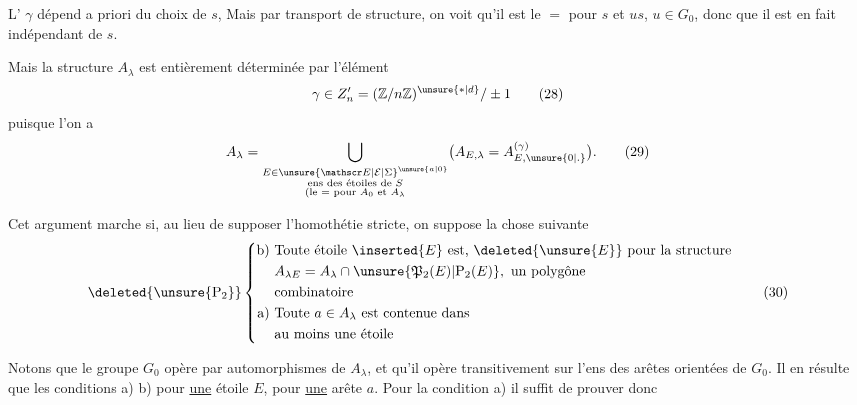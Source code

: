 L' $\gamma$ dépend a priori du choix de $s$, Mais  par transport de structure, on voit qu'il est le $=$ pour $s$ et  $us$, $u\in G_0$, donc que il est en fait indépendant de $s$.

Mais   la structure $A_\lambda$ est entièrement déterminée par  l'élément
\[
\gamma\in Z'_n=(\mathbb Z/n\mathbb Z)^{\unsure{*|d}}/\pm1\tag*{(28)}
\]
puisque l'on a
\[
A_\lambda=\bigcup_{\substack{E\in{\unsure{\mathscr E|\mathcal E|\Sigma}}^{\unsure{a|0}}\\\text{ens des étoiles de } S\\(\text{le }=\text{ pour }A_0\text{ et }A_\lambda}}
\bigl(A_{E,\lambda}=A_{E,\unsure{0|.}}^{(\gamma)}\bigr).\tag*{(29)}
\]

Cet argument marche si, au lieu de supposer l'homothétie stricte, on suppose la chose suivante
\[
\deleted{\unsure{\mathrm P_2}}\left\{\begin{aligned}
\text{b)}\ &\text{Toute étoile }\inserted{E}\text{ est, }\deleted{\unsure{E}}\text{ pour la structure}\\
&A_{\lambda E}=A_\lambda\cap\unsure{\mathfrak P_2(E)|\mathrm P_2(E)},\ \text{un polygône}\\
&\text{combinatoire}\\
\text{a)}\ &\text{Toute }a\in A_\lambda\text{ est contenue dans}\\
&\text{au moins une étoile}
\end{aligned}\right.\tag*{(30)}
\]
\noindent{}

Notons que le groupe $G_0$ opère par automorphismes de $A_\lambda$, et qu'il opère transitivement sur l'ens des arêtes orientées de $G_0$. Il en résulte que  les conditions a) b) pour \uline{une} étoile $E$, pour \uline{une} arête $a$.  Pour la condition a) il suffit de prouver donc

